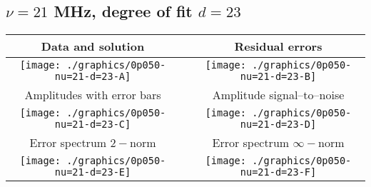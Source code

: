 

% 

\clearpage{}
\break{}

\subsection{$\nu = 21$ MHz, degree of fit $d = 23$}

\begin{table}[h]
    \begin{center}
        \begin{tabular}{ccc}
            Data and solution & \quad & Residual errors \\\hline
            \texttt{[image: ./graphics/0p050-nu=21-d=23-A]} &&
            \texttt{[image: ./graphics/0p050-nu=21-d=23-B]} \\[15pt]
            Amplitudes with error bars && Amplitude signal--to--noise \\\hline
            \texttt{[image: ./graphics/0p050-nu=21-d=23-C]} &&
            \texttt{[image: ./graphics/0p050-nu=21-d=23-D]} \\[15pt]
            Error spectrum $2-$norm && Error spectrum $\infty-$norm \\\hline
            \texttt{[image: ./graphics/0p050-nu=21-d=23-E]} &&
            \texttt{[image: ./graphics/0p050-nu=21-d=23-F]} \\[15pt]
        \end{tabular}
    \end{center}
\label{fig:elev=50, nu=21}
\end{table}



\endinput
